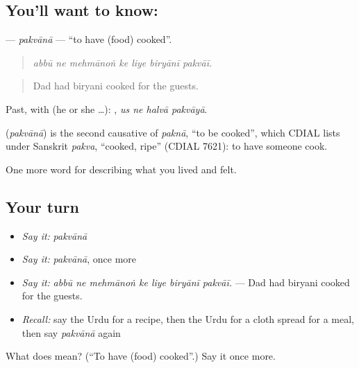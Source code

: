 \subsection*{You'll want to know: }
\textbf{} — \emph{pakvānā} — \textquotedblleft{}to have (food) cooked\textquotedblright{}.

\begin{quote}
      
\end{quote}

\begin{quote}
\emph{abbū ne mehmānoṅ ke liye biryānī pakvāī.}
\end{quote}

\begin{quote}
Dad had biryani cooked for the guests.
\end{quote}

Past, with  (he or she …):    , \emph{us ne halvā pakvāyā}.

\begin{cousinweb}
\textbf{} (\emph{pakvānā}) is the second causative of \emph{paknā}, \textquotedblleft{}to be cooked\textquotedblright{}, which CDIAL lists under Sanskrit \emph{pakva}, \textquotedblleft{}cooked, ripe\textquotedblright{} (CDIAL 7621): to have someone cook.
\end{cousinweb}

\begin{grammarlens}[title={What you've built}]
One more word for describing what you lived and felt.
\end{grammarlens}

\subsection*{Your turn}
\begin{itemize}
\raggedright
  \item \emph{Say it:} \emph{pakvānā}
  \item \emph{Say it:} \emph{pakvānā}, once more
  \item \emph{Say it:} \emph{abbū ne mehmānoṅ ke liye biryānī pakvāī.} — Dad had biryani cooked for the guests.
  \item \emph{Recall:} say the Urdu for a recipe, then the Urdu for a cloth spread for a meal, then say \emph{pakvānā} again
\end{itemize}

\begin{tcolorbox}[breakable,colback=teal!4,colframe=teal!35!black,title={Before you move on}]
What does  mean? (\textquotedblleft{}To have (food) cooked\textquotedblright{}.) Say it once more.
\end{tcolorbox}
